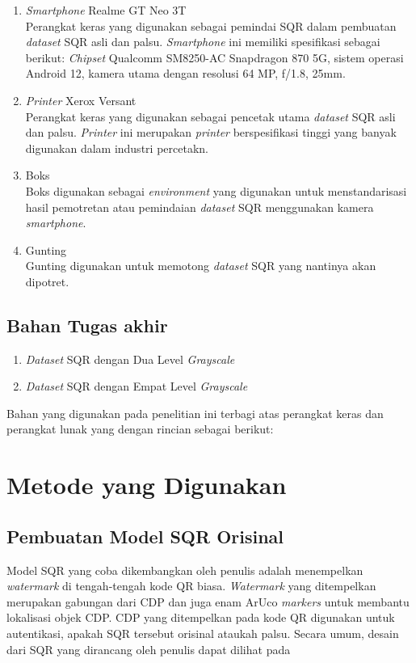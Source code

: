 \begin{enumerate}
	\item \emph{Smartphone} Realme GT Neo 3T\\Perangkat keras yang digunakan sebagai pemindai SQR dalam pembuatan \emph{dataset} SQR asli dan palsu. \emph{Smartphone} ini memiliki spesifikasi sebagai berikut: \emph{Chipset} Qualcomm SM8250-AC Snapdragon 870 5G, sistem operasi Android 12, kamera utama dengan resolusi 64 MP, f/1.8, 25mm.
	\item \emph{Printer} Xerox Versant\\Perangkat keras yang digunakan sebagai pencetak utama \emph{dataset} SQR asli dan palsu. \emph{Printer} ini merupakan \emph{printer} berspesifikasi tinggi yang banyak digunakan dalam industri percetakn.
	\item Boks\\Boks digunakan sebagai \emph{environment} yang digunakan untuk menstandarisasi hasil pemotretan atau pemindaian \emph{dataset} SQR menggunakan kamera
	      \emph{smartphone}.
	\item Gunting\\Gunting digunakan untuk memotong \emph{dataset} SQR yang nantinya akan dipotret.
\end{enumerate}

\subsection{Bahan Tugas akhir}
\begin{enumerate}
	\item \emph{Dataset} SQR dengan Dua Level \emph{Grayscale}
	\item \emph{Dataset} SQR dengan Empat Level \emph{Grayscale}
\end{enumerate}

Bahan yang digunakan pada penelitian ini terbagi atas perangkat keras dan perangkat lunak yang dengan rincian sebagai berikut:

\section{Metode yang Digunakan}

\subsection{Pembuatan Model SQR Orisinal}
Model SQR yang coba dikembangkan oleh penulis adalah menempelkan \emph{watermark} di tengah-tengah kode QR biasa. \emph{Watermark} yang ditempelkan merupakan
gabungan dari CDP dan juga enam ArUco \emph{markers} untuk membantu lokalisasi objek CDP. CDP yang ditempelkan pada kode QR digunakan untuk autentikasi, apakah
SQR tersebut orisinal ataukah palsu. Secara umum, desain dari SQR yang dirancang oleh penulis dapat dilihat pada

